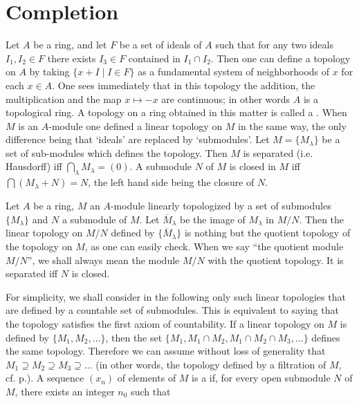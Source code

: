 \documentclass[../main]{subfiles}
\begin{document}
\section{Completion}\label{sec:23}

\newparagraph Let $A$ be a ring, and let $F$ be a set of ideals of $A$ such that for any two ideals $I_1, I_2 \in F$ there exists $I_3 \in F$ contained in $I_1 \cap I_2$. Then one can define a topology on $A$ by taking $\{x + I \mid I \in F\}$ as a fundamental system of neighborhoods of $x$ for each $x \in A$. One sees immediately that in this topology the addition, the multiplication and the map $x \mapsto -x$ are continuous; in other words $A$ is a topological ring. A topology on a ring obtained in this matter is called a . When $M$ is an $A$-module one defined a linear topology on $M$ in the same way, the only difference being that `ideals' are replaced by `submodules'. Let $M = \{M_\lambda\}$ be a set of sub-modules which defines the topology. Then $M$ is separated (i.e. Hausdorff) iff $\bigcap_\lambda M_\lambda = (0)$. A submodule $N$ of $M$ is closed in $M$ iff $\bigcap (M_\lambda + N) = N$, the left hand side being the closure of $N$. 

\newparagraph Let $A$ be a ring, $M$ an $A$-module linearly topologized by a set of submodules $\{M_\lambda\}$ and $N$ a submodule of $M$. Let $\overline M_\lambda$ be the image of $M_\lambda$ in $M/N$. Then the linear topology on $M/N$ defined by $\{\overline M_\lambda\}$ is nothing but the quotient topology of the topology on $M$, as one can easily check. When we say ``the quotient module $M/N$'', we shall always mean the module $M/N$ with the quotient topology. It is separated iff $N$ is closed.

\newparagraph For simplicity, we shall consider in the following only such linear topologies that are defined by a countable set of submodules. This is equivalent to saying that the topology satisfies the first axiom of countability. If a linear topology on $M$ is defined by $\{M_1, M_2, \ldots\}$, then the set $\{M_1, M_1 \cap M_2, M_1 \cap M_2 \cap M_3, \ldots\}$ defines the same topology. Therefore we can assume without loss of generality that $M_1 \supseteq M_2 \supseteq M_3 \supseteq \ldots$ (in other words, the topology defined by a filtration of $M$, cf. p.\pageref{def:filtration}). A sequence $(x_n)$ of elements of $M$ is a  if, for every open submodule $N$ of $M$, there exists an integer $n_0$ such that 
\end{document}
